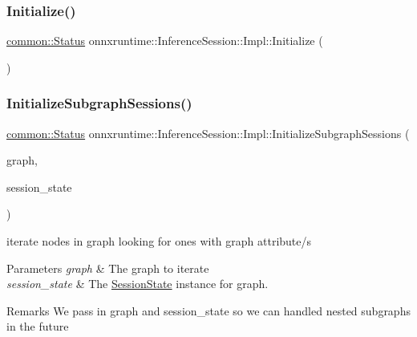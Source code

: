 \subsubsection{\texorpdfstring{Initialize()}{Initialize()}}
{\footnotesize\ttfamily \mbox{\hyperlink{classonnxruntime_1_1common_1_1Status}{common\+::\+Status}} onnxruntime\+::\+Inference\+Session\+::\+Impl\+::\+Initialize (\begin{DoxyParamCaption}{ }\end{DoxyParamCaption})\hspace{0.3cm}{\ttfamily [inline]}}

\mbox{\label{classonnxruntime_1_1InferenceSession_1_1Impl_a960c8120174f33252f37eeb1e8403aee}} 
\subsubsection{\texorpdfstring{Initialize\+Subgraph\+Sessions()}{InitializeSubgraphSessions()}}
{\footnotesize\ttfamily \mbox{\hyperlink{classonnxruntime_1_1common_1_1Status}{common\+::\+Status}} onnxruntime\+::\+Inference\+Session\+::\+Impl\+::\+Initialize\+Subgraph\+Sessions (\begin{DoxyParamCaption}\item[{\mbox{\hyperlink{classonnxruntime_1_1Graph}{Graph}} \&}]{graph,  }\item[{\mbox{\hyperlink{classonnxruntime_1_1SessionState}{Session\+State}} \&}]{session\+\_\+state }\end{DoxyParamCaption})\hspace{0.3cm}{\ttfamily [inline]}}

iterate nodes in graph looking for ones with graph attribute/s 
\begin{DoxyParams}{Parameters}
{\em graph} & The graph to iterate \\
\hline
{\em session\+\_\+state} & The \mbox{\hyperlink{classonnxruntime_1_1SessionState}{Session\+State}} instance for \textquotesingle{}graph\textquotesingle{}. \\
\hline
\end{DoxyParams}
\begin{DoxyRemark}{Remarks}
We pass in graph and session\+\_\+state so we can handled nested subgraphs in the future 
\end{DoxyRemark}
\mbox{\label{classonnxruntime_1_1InferenceSession_1_1Impl_a5b92cc49f13c0d6be9f61fb0ac5bf8ac}} 
